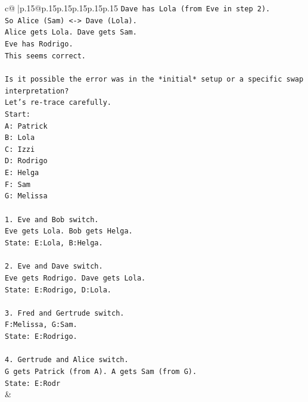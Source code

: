 \documentclass{article}
\begin{document}
{\begin{supertabular}{c@{$\;$}|p{.15\linewidth}@{}p{.15\linewidth}p{.15\linewidth}p{.15\linewidth}p{.15\linewidth}p{.15\linewidth}}
{{{\texttt{Dave has Lola (from Eve in step 2).} \\
\texttt{So Alice (Sam) <{-}> Dave (Lola).} \\
\texttt{Alice gets Lola. Dave gets Sam.} \\
\texttt{Eve has Rodrigo.} \\
\texttt{This seems correct.} \\
\\ 
\texttt{Is it possible the error was in the *initial* setup or a specific swap interpretation?} \\
\texttt{Let's re{-}trace carefully.} \\
\texttt{Start:} \\
\texttt{A: Patrick} \\
\texttt{B: Lola} \\
\texttt{C: Izzi} \\
\texttt{D: Rodrigo} \\
\texttt{E: Helga} \\
\texttt{F: Sam} \\
\texttt{G: Melissa} \\
\\ 
\texttt{1. Eve and Bob switch.} \\
\texttt{Eve gets Lola. Bob gets Helga.} \\
\texttt{State: E:Lola, B:Helga.} \\
\\ 
\texttt{2. Eve and Dave switch.} \\
\texttt{Eve gets Rodrigo. Dave gets Lola.} \\
\texttt{State: E:Rodrigo, D:Lola.} \\
\\ 
\texttt{3. Fred and Gertrude switch.} \\
\texttt{F:Melissa, G:Sam.} \\
\texttt{State: E:Rodrigo.} \\
\\ 
\texttt{4. Gertrude and Alice switch.} \\
\texttt{G gets Patrick (from A). A gets Sam (from G).} \\
\texttt{State: E:Rodr} \\
            }
        }
    }
    & \\ \\

\end{supertabular}
}
\end{document}

